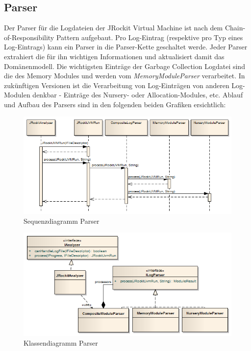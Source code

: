 \subsection{Parser}
Der Parser für die Logdateien der JRockit Virtual Machine ist nach dem Chain-of-Responsibility Pattern\cite{wiki:chainOfResponsibilityPattern} aufgebaut. Pro Log-Eintrag (respektive pro Typ eines Log-Eintrags) kann ein Parser in die Parser-Kette geschaltet werde. Jeder Parser extrahiert die für ihn wichtigen Informationen und aktualisiert damit das Domänenmodell. Die wichtigsten Einträge der Garbage Collection Logdatei sind die des Memory Modules und werden vom \textit{MemoryModuleParser} verarbeitet. In zukünftigen Versionen ist die Verarbeitung von Log-Einträgen von anderen Log-Modulen denkbar - Einträge des Nursery- oder Allocation-Modules, etc. Ablauf und Aufbau des Parsers sind in den folgenden beiden Grafiken ersichtlich:

 \begin{figure}[H]
  	\centering
    	\includegraphics[width=16cm]{images/acitivity_parse_prozess}
        	\caption{Sequenzdiagramm Parser}
\end{figure}
 \begin{figure}[H]
  	\centering
    	\includegraphics[width=16cm]{images/jrockit_log_processing}
        	\caption{Klassendiagramm Parser}
\end{figure}

